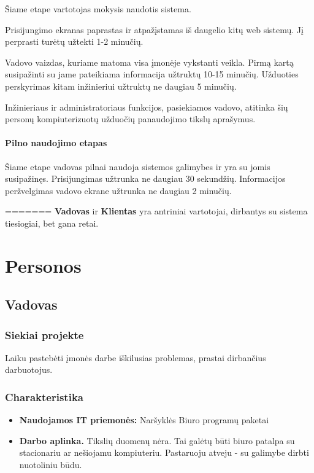 			Šiame etape vartotojas mokysis naudotis sistema.
			
			Prisijungimo ekranas paprastas ir atpažįstamas iš daugelio kitų web sistemų.
			Jį perprasti turėtų užtekti 1-2 minučių.

			Vadovo vaizdas, kuriame matoma visa įmonėje vykstanti veikla.
			Pirmą kartą susipažinti su jame pateikiama informacija užtruktų 10-15 minučių.
			Užduoties perskyrimas kitam inžinieriui užtruktų ne daugiau 5 minučių.
						
			Inžinieriaus ir administratoriaus funkcijos, pasiekiamos vadovo, atitinka šių personų kompiuterizuotų užduočių panaudojimo tikslų aprašymus.
			
			\setcounter{tocdepth}{5} \setcounter{secnumdepth}{5}
			
			\paragraph{Pilno naudojimo etapas}
			
			Šiame etape vadovas pilnai naudoja sistemos galimybes ir yra su jomis susipažinęs.
			Prisijungimas užtrunka ne daugiau 30 sekundžių. Informacijos peržvelgimas vadovo ekrane užtrunka ne daugiau 2 minučių.
			
			
	
=======
	\textbf{Vadovas} ir \textbf{Klientas} yra antriniai vartotojai, dirbantys su sistema tiesiogiai, bet gana retai.

\section{Personos}

	\subsection{Vadovas}
		
		\subsubsection{Siekiai projekte}
		
		Laiku pastebėti įmonės darbe iškilusias problemas, prastai dirbančius darbuotojus.
		
		\subsubsection{Charakteristika}
		
		\begin{itemize}
			\item \textbf{Naudojamos IT priemonės:}
				\subitem Naršyklės
				\subitem Biuro programų paketai
			\item \textbf{Darbo aplinka.} Tikslių duomenų nėra. 
			Tai galėtų būti biuro patalpa su stacionariu ar nešiojamu kompiuteriu.
			Pastaruoju atveju - su galimybe dirbti nuotoliniu būdu.
		\end{itemize}
			
